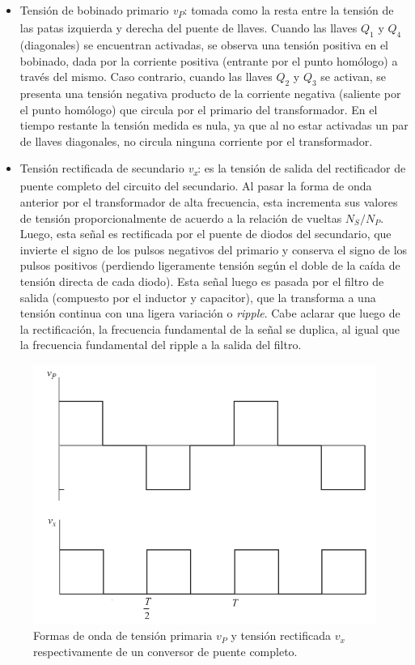 \begin{itemize}
    \item {\Medium Tensión de bobinado primario \textit{v\textsubscript{P}}}: tomada como la resta entre la tensión de las patas izquierda y derecha del puente de llaves. Cuando las llaves $Q_1$ y $Q_4$ (diagonales) se encuentran activadas, se observa una tensión positiva en el bobinado, dada por la corriente positiva (entrante por el punto homólogo) a través del mismo. Caso contrario, cuando las llaves $Q_2$ y $Q_3$ se activan, se presenta una tensión negativa producto de la corriente negativa (saliente por el punto homólogo) que circula por el primario del transformador. En el tiempo restante la tensión medida es nula, ya que al no estar activadas un par de llaves diagonales, no circula ninguna corriente por el transformador.
    \item {\Medium Tensión rectificada de secundario \textit{v\textsubscript{x}}}: es la tensión de salida del rectificador de puente completo del circuito del secundario. Al pasar la forma de onda anterior por el transformador de alta frecuencia, esta incrementa sus valores de tensión proporcionalmente de acuerdo a la relación de vueltas $N_S/N_P$. Luego, esta señal es rectificada por el puente de diodos del secundario, que invierte el signo de los pulsos negativos del primario y conserva el signo de los pulsos positivos (perdiendo ligeramente tensión según el doble de la caída de tensión directa de cada diodo). Esta señal luego es pasada por el filtro de salida (compuesto por el inductor y capacitor), que la transforma a una tensión continua con una ligera variación o \textit{ripple}. Cabe aclarar que luego de la rectificación, la frecuencia fundamental de la señal se duplica, al igual que la frecuencia fundamental del ripple a la salida del filtro.
\end{itemize}

\begin{figure}[h]
    \centering
    \includegraphics[scale=0.48]{Imagenes/Formas de onda Full-Bridge.png}
    \caption{Formas de onda de tensión primaria $v_P$ y tensión rectificada $v_x$ respectivamente de un conversor de puente completo.}
    \label{fullbridge-waveforms}
\end{figure}

\lipsum[1]\\